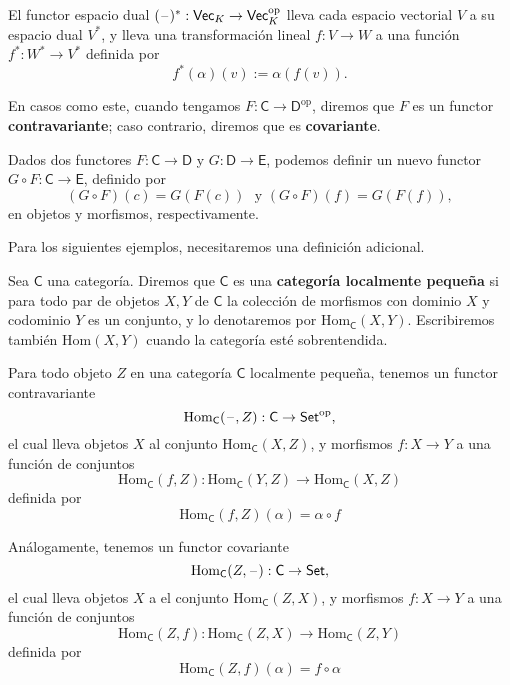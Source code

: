 \documentclass[../main.tex]{subfiles}
\begin{document}
\begin{exampleap}
    El functor espacio dual $(\mathord{\hspace{1pt}\text{--}\hspace{1pt}})^*:\mathsf{Vec}_K \to \mathsf{Vec}^{\text{op}}_K$ lleva cada espacio vectorial $V$ a su espacio dual $V^*$, y lleva una transformaci\'on lineal $f: V \to W$ a una funci\'on $f^*: W^* \to V^*$ definida por
    \[ f^*(\alpha)(v):= \alpha(f(v)). \]
\end{exampleap}

En casos como este, cuando tengamos $F:\mathsf{C} \to \mathsf{D}^{\text{op}}$, diremos que $F$ es un functor \textbf{contravariante}; caso contrario, diremos que es \textbf{covariante}.

\begin{exampleap}
    Dados dos functores $F:\mathsf{C} \to \mathsf{D}$ y $G:\mathsf{D} \to \mathsf{E}$, podemos definir un nuevo functor $G \circ F:\mathsf{C} \to \mathsf{E}$, definido por
    \[(G \circ F)(c) =G(F(c)) \,\, \text{ y } (G \circ F)(f)=G(F(f)),\] en objetos y morfismos, respectivamente.
\end{exampleap}

Para los siguientes ejemplos, necesitaremos una definici\'on adicional.

\begin{definitionap}
    Sea $\mathsf{C}$ una categor\'ia. Diremos que $\mathsf{C}$ es una \textbf{categor\'ia localmente peque\~na} si para todo par de objetos $X,Y$ de $\mathsf{C}$ la colecci\'on de morfismos con dominio $X$ y codominio $Y$ es un conjunto, y lo denotaremos por $\text{Hom}_\mathsf{C}(X,Y)$. Escribiremos tambi\'en $\text{Hom}(X,Y)$ cuando la categor\'ia est\'e sobrentendida.
\end{definitionap}

\begin{exampleap}\label{cat-homa-}
    Para todo objeto $Z$ en una categor\'ia $\mathsf{C}$ localmente peque\~na, tenemos un functor contravariante
    \[ \text{Hom}_\mathsf{C}(\mathord{\hspace{1pt}\text{--}\hspace{1pt}}, Z): \mathsf{C} \to \mathsf{Set}^{\text{op}},\]
    el cual lleva objetos $X$ al conjunto $\text{Hom}_\mathsf{C}(X,Z)$, y morfismos $f:X \to Y$ a una funci\'on de conjuntos
    \[ \text{Hom}_\mathsf{C}(f, Z):\text{Hom}_\mathsf{C}(Y,Z) \to \text{Hom}_\mathsf{C}(X,Z) \]
    definida por
    \[ \text{Hom}_\mathsf{C}(f, Z)(\alpha) = \alpha \circ f \]

    An\'alogamente, tenemos un functor covariante
    \[ \text{Hom}_\mathsf{C}(Z, \mathord{\hspace{1pt}\text{--}\hspace{1pt}}): \mathsf{C} \to \mathsf{Set},\]
    el cual lleva objetos $X$ a el conjunto $\text{Hom}_\mathsf{C}(Z,X)$, y morfismos $f:X \to Y$ a una funci\'on de conjuntos
    \[ \text{Hom}_\mathsf{C}(Z,f):\text{Hom}_\mathsf{C}(Z,X) \to \text{Hom}_\mathsf{C}(Z,Y) \]
    definida por
    \[ \text{Hom}_\mathsf{C}(Z,f)(\alpha) = f \circ \alpha \]
\end{exampleap}
\end{document}
